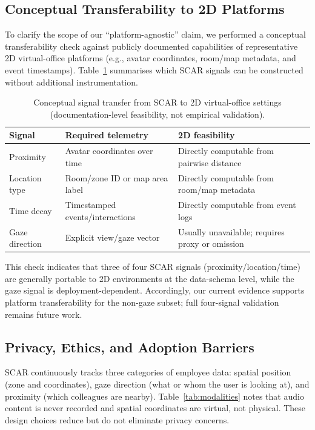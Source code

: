 \documentclass[journal]{IEEEtran}
\begin{document}
\subsection{Conceptual Transferability to 2D Platforms}
\label{subsec:2d_transferability}

To clarify the scope of our ``platform-agnostic'' claim, we performed a
conceptual transferability check against publicly documented capabilities
of representative 2D virtual-office platforms (e.g., avatar coordinates,
room/map metadata, and event timestamps). Table~\ref{tab:2d_transfer}
summarises which SCAR signals can be constructed without additional
instrumentation.

\begin{table}[htbp]
\centering
\caption{Conceptual signal transfer from SCAR to 2D virtual-office settings (documentation-level feasibility, not empirical validation).}
\label{tab:2d_transfer}
\begin{tabular}{p{1.7cm}p{3.3cm}p{3.0cm}}
\hline
\textbf{Signal} & \textbf{Required telemetry} & \textbf{2D feasibility} \\
\hline
Proximity & Avatar coordinates over time & Directly computable from pairwise distance \\
Location type & Room/zone ID or map area label & Directly computable from room/map metadata \\
Time decay & Timestamped events/interactions & Directly computable from event logs \\
Gaze direction & Explicit view/gaze vector & Usually unavailable; requires proxy or omission \\
\hline
\end{tabular}
\end{table}

This check indicates that three of four SCAR signals
(proximity/location/time) are generally portable to 2D environments at
the data-schema level, while the gaze signal is deployment-dependent.
Accordingly, our current evidence supports platform transferability for
the non-gaze subset; full four-signal validation remains future work.

\subsection{Privacy, Ethics, and Adoption Barriers}
\label{subsec:privacy_ethics}

SCAR continuously tracks three categories of employee data: spatial position (zone and coordinates), gaze direction (what or whom the user is looking at), and proximity (which colleagues are nearby). Table~\ref{tab:modalities} notes that audio content is never recorded and spatial coordinates are virtual, not physical. These design choices reduce but do not eliminate privacy concerns.
\end{document}
